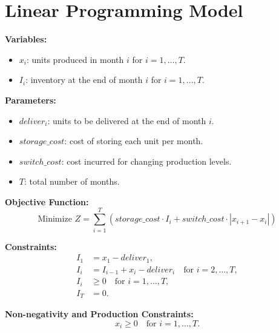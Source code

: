 \documentclass{article}
\begin{document}
\section*{Linear Programming Model}

\textbf{Variables:}
\begin{itemize}
    \item $x_i$: units produced in month $i$ for $i = 1, \ldots, T$.
    \item $I_i$: inventory at the end of month $i$ for $i = 1, \ldots, T$.
\end{itemize}

\textbf{Parameters:}
\begin{itemize}
    \item $deliver_i$: units to be delivered at the end of month $i$.
    \item $storage\_cost$: cost of storing each unit per month.
    \item $switch\_cost$: cost incurred for changing production levels.
    \item $T$: total number of months.
\end{itemize}

\textbf{Objective Function:}
\[
\text{Minimize } Z = \sum_{i=1}^{T} (storage\_cost \cdot I_i + switch\_cost \cdot |x_{i+1} - x_i|)
\]

\textbf{Constraints:}
\begin{align*}
    I_1 & = x_1 - deliver_1, \\
    I_i & = I_{i-1} + x_i - deliver_i \quad \text{for } i = 2, \ldots, T, \\
    I_i & \geq 0 \quad \text{for } i = 1, \ldots, T, \\
    I_T & = 0.
\end{align*}

\textbf{Non-negativity and Production Constraints:}
\[
x_i \geq 0 \quad \text{for } i = 1, \ldots, T.
\]
\end{document}
